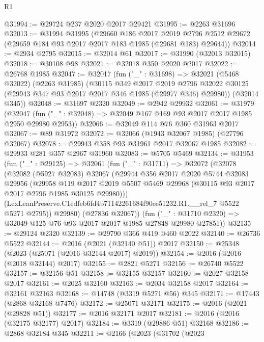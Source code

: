 \begin{lexlean}{R1}
\begin{coremodule}
@31994 := @29724 @237 @2020 @2017 @29421
@31995 := @2263 @31696
@32013 := @31994
    @31995
    (@29660
      @186
      @2017
      @2019
      @2796
      @2512
      @29672
      (@29659 @184 @93 @2017 @2017 @183 @1985 (@29681 @183) @29644))
@32014 := @2934 @2795
@32015 := @32014 @61
@32017 := @31990 (@32013 @32015)
@32018 := @30108 @98
@32021 := @32018 @350 @2020 @2017
@32022 := @26768 @1985
@32047 := @32017
    (fun ("_" : @31698) =>
    @32021
      (@5468 @32022)
      (@2263 @31985)
      (@30115
        @349
        @2017
        @2019
        @2796
        @32022
        @30125
        (@29943 @347 @93 @2017 @2017 @346 @1985 (@29977 @346) @29980))
      (@32014 @345))
@32048 := @31697 @2320
@32049 := @2942 @29932
@32061 := @31979
    (@32047 (fun ("_" : @32048) => @32049 @167 @169 @93 @2017 @2017 @1985 @2950 @29980 @2953))
@32066 := @32049 @114 @76 @360 @31963 @2017
@32067 := @89 @31972
@32072 := @32066 (@1943 @32067 @1985) (@27796 @32067)
@32078 := @29943 @358 @93 @31961 @2017 @32067 @1985
@32082 := @29933 @281 @357 @2967 @31960
@32083 := @5705 @5469
@32134 := @31953
    (fun ("_" : @29125) =>
    @32061
      (fun ("_" : @31711) =>
      @32072
        (@32078
          (@32082
            (@5927 @32083)
            @32067
            (@29944
              @356
              @2017
              @2020
              @5744
              @32083
              @29956
              (@29958
                @119
                @2017
                @2019
                @5507
                @5469
                @29968
                (@30115 @93 @2017 @2017 @2796 @1985 @30125 @29980)))
            (LexLeanPreserve.C1edfeb6fd4b71142261684f90ee51232.R1.__rel_7 @5522 @5271 @2795))
          @29980)
        (@27836 @32067))
      (fun ("_" : @31710 @2320) => @32049 @125 @76 @93 @2017 @2017 @1985 @27848 @29980 @27851))
@32135 := @29124 @2320
@32139 := @29790 @366 @419 @460 @2022
@32140 := @26736 @5522
@32144 := @2016 (@2021 (@32140 @51)) @2017
@32150 := @25348 (@2023 (@25071 (@2016 @32144 @2017) @2019))
@32154 := @2016 (@2016 (@2018 @32144) @2017)
@32155 := @2821 @5271
@32156 := @26740 @5522
@32157 := @32156 @51
@32158 := @32155 @32157
@32160 := @2027 @32158 @2017
@32161 := @2025 @32160
@32163 := @2034 @32158 @2017
@32164 := @32161 @32163
@32168 := @14748 (@3319 @5271 @56) @345
@32171 := @17443 (@2868 @32168 @7476)
@32172 := @25071 @32171
@32175 := @2016 (@2021 (@29828 @51))
@32177 := @2016 @32171 @2017
@32181 := @2016 (@2016 (@32175 @32177) @2017)
@32184 := @3319 (@29886 @51) @32168
@32186 := @2868 @32184 @345
@32211 := @2166
    (@2023
      (@31702
        (@2023

\end{coremodule}
\end{lexlean}
